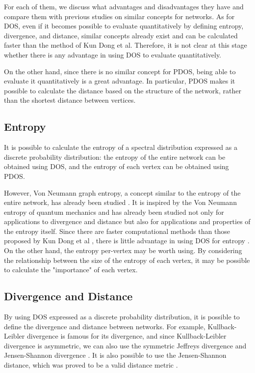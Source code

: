 \documentclass[senior,final,11pt]{iscs-thesis}
\begin{document}
For each of them, we discuss what advantages and disadvantages they have and compare them with previous studies on similar concepts for networks. As for DOS, even if it becomes possible to evaluate quantitatively by defining entropy, divergence, and distance, similar concepts already exist and can be calculated faster than the method of Kun Dong et al. Therefore, it is not clear at this stage whether there is any advantage in using DOS to evaluate quantitatively.

On the other hand, since there is no similar concept for PDOS, being able to evaluate it quantitatively is a great advantage. In particular, PDOS makes it possible to calculate the distance based on the structure of the network, rather than the shortest distance between vertices.

\subsection{Entropy}
It is possible to calculate the entropy of a spectral distribution expressed as a discrete probability distribution: the entropy of the entire network can be obtained using DOS, and the entropy of each vertex can be obtained using PDOS.

However, Von Neumann graph entropy, a concept similar to the entropy of the entire network, has already been studied \cite{braunstein2006laplacian, chen2019fast,tsitsulin2020just}. It is inspired by the Von Neumann entropy of quantum mechanics and has already been studied not only for applications to divergence and distance but also for applications and properties of the entropy itself. Since there are faster computational methods \cite{chen2019fast,tsitsulin2020just} than those proposed by Kun Dong et al \cite{dong2019network}, there is little advantage in using DOS for entropy .
On the other hand, the entropy per-vertex may be worth using. By considering the relationship between the size of the entropy of each vertex, it may be possible to calculate the "importance" of each vertex.


\subsection{Divergence and Distance}
By using DOS expressed as a discrete probability distribution, it is possible to define the divergence and distance between networks. For example, Kullback-Leibler divergence \cite{kullback1951information} is famous for its divergence, and since Kullback-Leibler divergence is asymmetric, we can also use the symmetric Jeffreys divergence and Jensen-Shannon divergence \cite{nielsen2019jensen, lin1991divergence, jeffreys1946invariant}. It is also possible to use the Jensen-Shannon distance, which was proved to be a valid distance metric \cite{endres2003new}.
\end{document}
